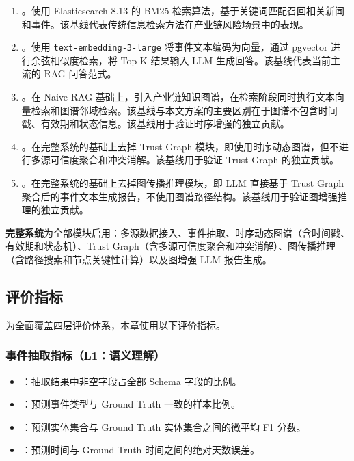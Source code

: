 \begin{enumerate}
    \item {}。使用 Elasticsearch 8.13 的 BM25 检索算法，基于关键词匹配召回相关新闻和事件。该基线代表传统信息检索方法在产业链风险场景中的表现。
    \item {}。使用 \texttt{text-embedding-3-large} 将事件文本编码为向量，通过 pgvector 进行余弦相似度检索，将 Top-K 结果输入 LLM 生成回答。该基线代表当前主流的 RAG 问答范式。
    \item {}。在 Naive RAG 基础上，引入产业链知识图谱，在检索阶段同时执行文本向量检索和图谱邻域检索。该基线与本文方案的主要区别在于图谱不包含时间戳、有效期和状态信息。该基线用于验证时序增强的独立贡献。
    \item {}。在\projectshort 完整系统的基础上去掉 Trust Graph 模块，即使用时序动态图谱，但不进行多源可信度聚合和冲突消解。该基线用于验证 Trust Graph 的独立贡献。
    \item {}。在\projectshort 完整系统的基础上去掉图传播推理模块，即 LLM 直接基于 Trust Graph 聚合后的事件文本生成报告，不使用图谱路径结构。该基线用于验证图增强推理的独立贡献。
\end{enumerate}

\textbf{完整系统}为\projectshort 全部模块启用：多源数据接入、事件抽取、时序动态图谱（含时间戳、有效期和状态机）、Trust Graph（含多源可信度聚合和冲突消解）、图传播推理（含路径搜索和节点关键性计算）以及图增强 LLM 报告生成。

\subsection{评价指标}
\label{sec:exp-metrics}

为全面覆盖四层评价体系，本章使用以下评价指标。

\subsubsection{事件抽取指标（L1：语义理解）}

\begin{itemize}
    \item {}：抽取结果中非空字段占全部 Schema 字段的比例。
    \item {}：预测事件类型与 Ground Truth 一致的样本比例。
    \item {}：预测实体集合与 Ground Truth 实体集合之间的微平均 F1 分数。
    \item {}：预测时间与 Ground Truth 时间之间的绝对天数误差。
\end{itemize}

